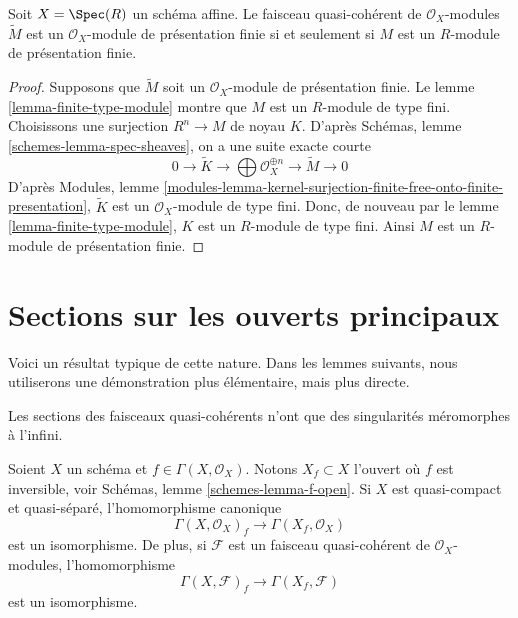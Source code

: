 \begin{lemma}
\label{lemma-finite-presentation-module}
Soit $X = \Spec(R)$ un schéma affine. Le faisceau quasi-cohérent
de $\mathcal{O}_X$-modules $\widetilde M$ est un $\mathcal{O}_X$-module de
présentation finie si et seulement si $M$ est un $R$-module de présentation finie.
\end{lemma}

\begin{proof}
Supposons que $\widetilde M$ soit un $\mathcal{O}_X$-module de présentation finie.
Le lemme \ref{lemma-finite-type-module} montre que $M$ est un $R$-module de type fini.
Choisissons une surjection $R^n \to M$ de noyau $K$. D'après
Schémas, lemme \ref{schemes-lemma-spec-sheaves},
on a une suite exacte courte
$$
0 \to \widetilde{K} \to
\bigoplus \mathcal{O}_X^{\oplus n} \to
\widetilde{M} \to 0
$$
D'après
Modules, lemme
\ref{modules-lemma-kernel-surjection-finite-free-onto-finite-presentation},
$\widetilde{K}$ est un $\mathcal{O}_X$-module de type fini.
Donc, de nouveau par le lemme \ref{lemma-finite-type-module},
$K$ est un $R$-module de type fini.
Ainsi $M$ est un $R$-module de présentation finie.
\end{proof}

\section{Sections sur les ouverts principaux}
\label{section-principal-opens}

\noindent
Voici un résultat typique de cette nature. Dans les lemmes suivants, nous utiliserons une
démonstration plus élémentaire, mais plus directe.

\begin{lemma}
\label{lemma-invert-f-sections}
\begin{slogan}
Les sections des faisceaux quasi-cohérents n'ont que des singularités méromorphes
à l'infini.
\end{slogan}
Soient $X$ un schéma et $f \in \Gamma(X, \mathcal{O}_X)$.
Notons $X_f \subset X$ l'ouvert où $f$ est inversible, voir
Schémas, lemme \ref{schemes-lemma-f-open}.
Si $X$ est quasi-compact et quasi-séparé, l'homomorphisme canonique
$$
\Gamma(X, \mathcal{O}_X)_f \longrightarrow \Gamma(X_f, \mathcal{O}_X)
$$
est un isomorphisme. De plus, si $\mathcal{F}$ est un faisceau
quasi-cohérent de $\mathcal{O}_X$-modules, l'homomorphisme
$$
\Gamma(X, \mathcal{F})_f \longrightarrow \Gamma(X_f, \mathcal{F})
$$
est un isomorphisme.
\end{lemma}

